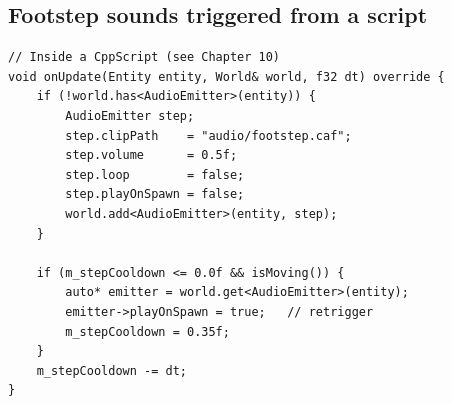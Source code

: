 \subsection{Footstep sounds triggered from a script}

\begin{lstlisting}
// Inside a CppScript (see Chapter 10)
void onUpdate(Entity entity, World& world, f32 dt) override {
    if (!world.has<AudioEmitter>(entity)) {
        AudioEmitter step;
        step.clipPath    = "audio/footstep.caf";
        step.volume      = 0.5f;
        step.loop        = false;
        step.playOnSpawn = false;
        world.add<AudioEmitter>(entity, step);
    }

    if (m_stepCooldown <= 0.0f && isMoving()) {
        auto* emitter = world.get<AudioEmitter>(entity);
        emitter->playOnSpawn = true;   // retrigger
        m_stepCooldown = 0.35f;
    }
    m_stepCooldown -= dt;
}
\end{lstlisting}
